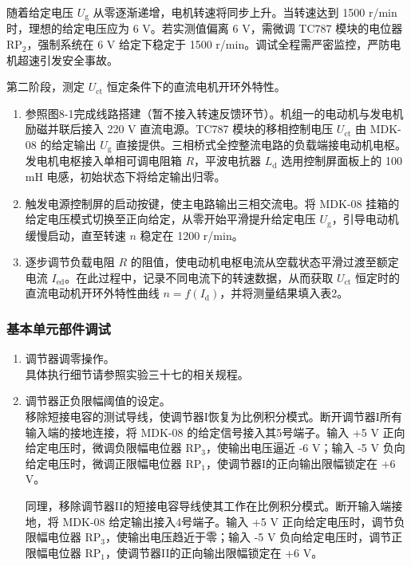 \begin{framed}
{			随着给定电压 $U_{\text{g}}$ 从零逐渐递增，电机转速将同步上升。当转速达到 1500 r/min 时，理想的给定电压应为 6 V。若实测值偏离 6 V，需微调 TC787 模块的电位器 $\text{RP}_2$，强制系统在 6 V 给定下稳定于 1500 r/min。调试全程需严密监控，严防电机超速引发安全事故。
			
			第二阶段，测定 $U_{\text{ct}}$ 恒定条件下的直流电机开环外特性。
			\begin{enumerate}
				\item 参照图8-1完成线路搭建（暂不接入转速反馈环节）。机组一的电动机与发电机励磁并联后接入 220 V 直流电源。TC787 模块的移相控制电压 $U_{\text{ct}}$ 由 MDK-08 的给定输出 $U_{\text{g}}$ 直接提供。三相桥式全控整流电路的负载端接电动机电枢。发电机电枢接入单相可调电阻箱 $R$，平波电抗器 $L_\text{d}$ 选用控制屏面板上的 100 mH 电感，初始状态下将给定输出归零。
				\item 触发电源控制屏的启动按键，使主电路输出三相交流电。将 MDK-08 挂箱的给定电压模式切换至正向给定，从零开始平滑提升给定电压 $U_{\text{g}}$，引导电动机缓慢启动，直至转速 $n$ 稳定在 1200 r/min。
				\item 逐步调节负载电阻 $R$ 的阻值，使电动机电枢电流从空载状态平滑过渡至额定电流 $I_{\text{ed}}$。在此过程中，记录不同电流下的转速数据，从而获取 $U_{\text{ct}}$ 恒定时的直流电动机开环外特性曲线 $n=f(I_{\text{d}})$，并将测量结果填入表2。
			\end{enumerate}
			
			\subsubsection{基本单元部件调试}
			\begin{enumerate}
				\item 调节器调零操作。\\
				具体执行细节请参照实验三十七的相关规程。
				
				\item 调节器正负限幅阈值的设定。\\
				移除短接电容的测试导线，使调节器I恢复为比例积分模式。断开调节器I所有输入端的接地连接，将 MDK-08 的给定信号接入其5号端子。输入 +5 V 正向给定电压时，微调负限幅电位器 $\text{RP}_3$，使输出电压逼近 -6 V；输入 -5 V 负向给定电压时，微调正限幅电位器 $\text{RP}_1$，使调节器I的正向输出限幅锁定在 +6 V。
				
				同理，移除调节器II的短接电容导线使其工作在比例积分模式。断开输入端接地，将 MDK-08 给定输出接入4号端子。输入 +5 V 正向给定电压时，调节负限幅电位器 $\text{RP}_3$，使输出电压趋近于零；输入 -5 V 负向给定电压时，调节正限幅电位器 $\text{RP}_1$，使调节器II的正向输出限幅锁定在 +6 V。
				

\end{enumerate}}
\end{framed}
